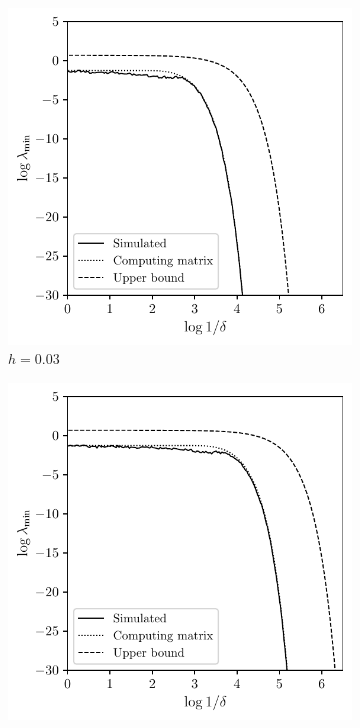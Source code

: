 \begin{figure}[t]
  \centering
  \begin{subfigure}{0.49\textwidth}
    \centering
    \includegraphics[scale=0.64]{graphics/sim_2.pdf}
    \caption{$h = 0.03$}
  \end{subfigure}
  \begin{subfigure}{0.49\textwidth}
    \centering
    \includegraphics[scale=0.64]{graphics/sim_1.pdf}

\end{subfigure}
\end{figure}
